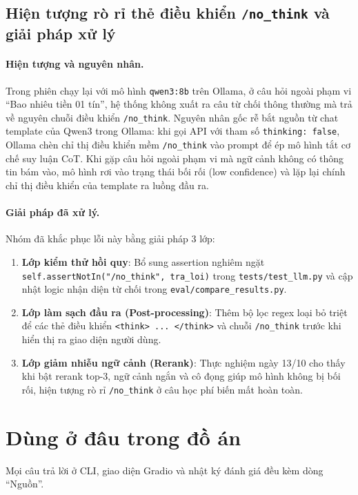 \subsection{Hiện tượng rò rỉ thẻ điều khiển \texttt{/no\_think} và giải pháp xử lý}

\paragraph{Hiện tượng và nguyên nhân.} Trong phiên chạy lại với mô hình \texttt{qwen3:8b} trên Ollama, ở câu hỏi ngoài phạm vi ``Bao nhiêu tiền 01 tín'', hệ thống không xuất ra câu từ chối thông thường mà trả về nguyên chuỗi điều khiển \texttt{/no\_think}. Nguyên nhân gốc rễ bắt nguồn từ chat template của Qwen3 trong Ollama: khi gọi API với tham số \texttt{thinking: false}, Ollama chèn chỉ thị điều khiển mềm \texttt{/no\_think} vào prompt để ép mô hình tắt cơ chế suy luận CoT. Khi gặp câu hỏi ngoài phạm vi mà ngữ cảnh không có thông tin bám vào, mô hình rơi vào trạng thái bối rối (low confidence) và lặp lại chính chỉ thị điều khiển của template ra luồng đầu ra.

\paragraph{Giải pháp đã xử lý.} Nhóm đã khắc phục lỗi này bằng giải pháp 3 lớp:
\begin{enumerate}
  \item \textbf{Lớp kiểm thử hồi quy}: Bổ sung assertion nghiêm ngặt \texttt{self.assertNotIn("/no\_think", tra\_loi)} trong \texttt{tests/test\_llm.py} và cập nhật logic nhận diện từ chối trong \texttt{eval/compare\_results.py}.
  \item \textbf{Lớp làm sạch đầu ra (Post-processing)}: Thêm bộ lọc regex loại bỏ triệt để các thẻ điều khiển \texttt{<think> ... </think>} và chuỗi \texttt{/no\_think} trước khi hiển thị ra giao diện người dùng.
  \item \textbf{Lớp giảm nhiễu ngữ cảnh (Rerank)}: Thực nghiệm ngày 13/10 cho thấy khi bật rerank top-3, ngữ cảnh ngắn và cô đọng giúp mô hình không bị bối rối, hiện tượng rò rỉ \texttt{/no\_think} ở câu học phí biến mất hoàn toàn.
\end{enumerate}

\section{Dùng ở đâu trong đồ án}

Mọi câu trả lời ở CLI, giao diện Gradio và nhật ký đánh giá đều kèm dòng ``Nguồn''.
